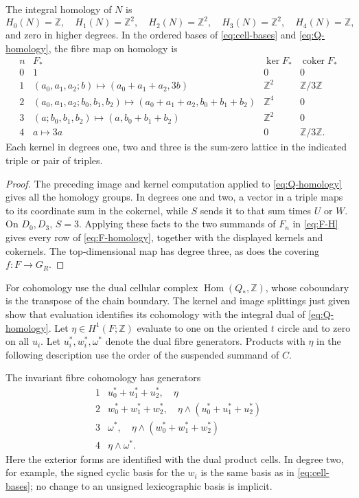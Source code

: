 \documentclass[11pt]{article}
\numberwithin{equation}{section}
\providecommand{\Z}{\mathbb Z}
\providecommand{\coker}{\operatorname{coker}}
\begin{document}
\begin{theorem}\label{thm:homology}
The integral homology of $N$ is
\[
 H_0(N)=\Z,\quad H_1(N)=\Z^2,\quad H_2(N)=\Z^2,
 \quad H_3(N)=\Z^2,\quad H_4(N)=\Z,
\]
and zero in higher degrees. In the ordered bases of
\eqref{eq:cell-bases} and \eqref{eq:Q-homology}, the fibre map on
homology is
\begin{equation}\label{eq:F-homology}
\begin{array}{c|c|c|c}
 n&F_*&\ker F_*&\coker F_*\\ \hline
 0&1&0&0\\
 1&(a_0,a_1,a_2;b)\mapsto(a_0+a_1+a_2,3b)&\Z^2&\Z/3\Z\\
 2&(a_0,a_1,a_2;b_0,b_1,b_2)\mapsto
       (a_0+a_1+a_2,b_0+b_1+b_2)&\Z^4&0\\
 3&(a;b_0,b_1,b_2)\mapsto(a,b_0+b_1+b_2)&\Z^2&0\\
 4&a\mapsto3a&0&\Z/3\Z.
\end{array}
\end{equation}
Each kernel in degrees one, two and three is the sum-zero lattice
in the indicated triple or pair of triples.
\end{theorem}
\begin{proof}
The preceding image and kernel computation applied to
\eqref{eq:Q-homology} gives all the homology groups.
In degrees one and two, a vector in a triple maps to its coordinate
sum in the cokernel, while $S$ sends it to that sum times $U$ or $W$.
On $D_0,D_3$, $S=3$. Applying these facts to the two summands
of $F_n$ in \eqref{eq:F-H} gives every row of
\eqref{eq:F-homology}, together with the displayed kernels and
cokernels. The top-dimensional map has degree three, as does the
covering $f:F\to G_R$.
\end{proof}

For cohomology use the dual cellular complex
$\operatorname{Hom}(Q_*,\Z)$, whose coboundary is the transpose of
the chain boundary. The kernel and image splittings just given show
that evaluation identifies its cohomology with the integral dual of
\eqref{eq:Q-homology}. Let $\eta\in H^1(F;\Z)$ evaluate to one
on the oriented $t$ circle and to zero on all $u_i$.
Let $u_i^*,w_i^*,\omega^*$ denote
the dual fibre generators. Products with $\eta$ in the following
description use the order of the suspended summand of $C$.

The invariant fibre cohomology has generators
\[
\begin{array}{c|c}
 1&u_0^*+u_1^*+u_2^*,\quad\eta\\
 2&w_0^*+w_1^*+w_2^*,\quad
       \eta\wedge(u_0^*+u_1^*+u_2^*)\\
 3&\omega^*,\quad\eta\wedge(w_0^*+w_1^*+w_2^*)\\
 4&\eta\wedge\omega^*.
\end{array}
\]
Here the exterior forms are identified with the dual product cells.
In degree two, for example, the signed cyclic basis for the $w_i$
is the same basis as in \eqref{eq:cell-bases}; no change to an
unsigned lexicographic basis is implicit.
\end{document}
